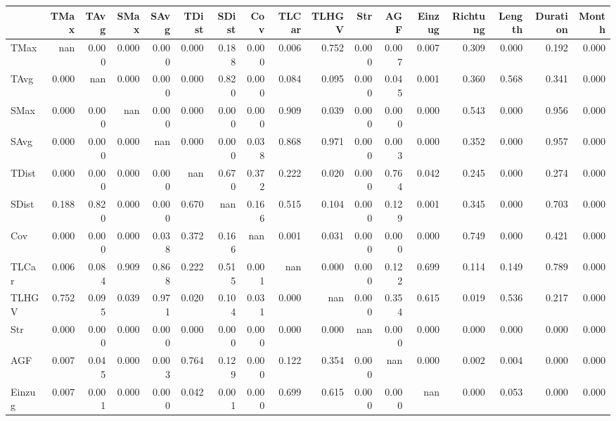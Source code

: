 \begin{tabular}{lrrrrrrrrrrrrrrrr}
\toprule
{} &  TMax &  TAvg &  SMax &  SAvg &  TDist &  SDist &   Cov &  TLCar &  TLHGV &   Str &   AGF &  Einzug &  Richtung &  Length &  Duration &  Month \\
\midrule
TMax     &   nan & 0.000 & 0.000 & 0.000 &  0.000 &  0.188 & 0.000 &  0.006 &  0.752 & 0.000 & 0.007 &   0.007 &     0.309 &   0.000 &     0.192 &  0.000 \\
TAvg     & 0.000 &   nan & 0.000 & 0.000 &  0.000 &  0.820 & 0.000 &  0.084 &  0.095 & 0.000 & 0.045 &   0.001 &     0.360 &   0.568 &     0.341 &  0.000 \\
SMax     & 0.000 & 0.000 &   nan & 0.000 &  0.000 &  0.000 & 0.000 &  0.909 &  0.039 & 0.000 & 0.000 &   0.000 &     0.543 &   0.000 &     0.956 &  0.000 \\
SAvg     & 0.000 & 0.000 & 0.000 &   nan &  0.000 &  0.000 & 0.038 &  0.868 &  0.971 & 0.000 & 0.003 &   0.000 &     0.352 &   0.000 &     0.957 &  0.000 \\
TDist    & 0.000 & 0.000 & 0.000 & 0.000 &    nan &  0.670 & 0.372 &  0.222 &  0.020 & 0.000 & 0.764 &   0.042 &     0.245 &   0.000 &     0.274 &  0.000 \\
SDist    & 0.188 & 0.820 & 0.000 & 0.000 &  0.670 &    nan & 0.166 &  0.515 &  0.104 & 0.000 & 0.129 &   0.001 &     0.345 &   0.000 &     0.703 &  0.000 \\
Cov      & 0.000 & 0.000 & 0.000 & 0.038 &  0.372 &  0.166 &   nan &  0.001 &  0.031 & 0.000 & 0.000 &   0.000 &     0.749 &   0.000 &     0.421 &  0.000 \\
TLCar    & 0.006 & 0.084 & 0.909 & 0.868 &  0.222 &  0.515 & 0.001 &    nan &  0.000 & 0.000 & 0.122 &   0.699 &     0.114 &   0.149 &     0.789 &  0.000 \\
TLHGV    & 0.752 & 0.095 & 0.039 & 0.971 &  0.020 &  0.104 & 0.031 &  0.000 &    nan & 0.000 & 0.354 &   0.615 &     0.019 &   0.536 &     0.217 &  0.000 \\
Str      & 0.000 & 0.000 & 0.000 & 0.000 &  0.000 &  0.000 & 0.000 &  0.000 &  0.000 &   nan & 0.000 &   0.000 &     0.000 &   0.000 &     0.000 &  0.000 \\
AGF      & 0.007 & 0.045 & 0.000 & 0.003 &  0.764 &  0.129 & 0.000 &  0.122 &  0.354 & 0.000 &   nan &   0.000 &     0.002 &   0.004 &     0.000 &  0.000 \\
Einzug   & 0.007 & 0.001 & 0.000 & 0.000 &  0.042 &  0.001 & 0.000 &  0.699 &  0.615 & 0.000 & 0.000 &     nan &     0.000 &   0.053 &     0.000 &  0.000 \\

\end{tabular}
